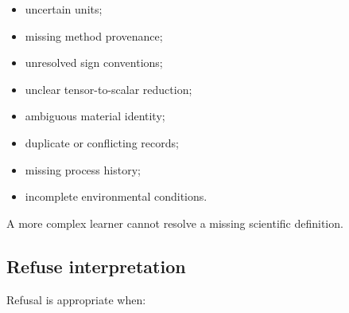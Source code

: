\documentclass[11pt,a4paper,oneside]{report}
\begin{document}
\begin{itemize}



\item

uncertain units;



\item

missing method provenance;



\item

unresolved sign conventions;



\item

unclear tensor-to-scalar reduction;



\item

ambiguous material identity;



\item

duplicate or conflicting records;



\item

missing process history;



\item

incomplete environmental conditions.



\end{itemize}



A more complex learner cannot resolve a missing scientific definition.





\subsection{Refuse interpretation}



Refusal is appropriate when:
\end{document}
